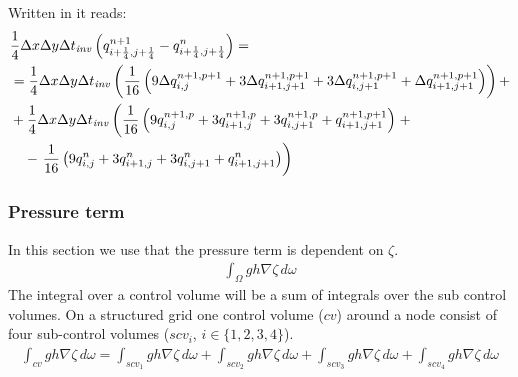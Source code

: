 Written in \deltaformulation  it reads:
\begin{align}
    &\frac{1}{4}\Delta x\Delta y\Delta t_{\it{inv}} \left( q^{n+1}_{i+\frac{1}{4}, j+\frac{1}{4}} -  q^{n}_{i+\frac{1}{4}, j+\frac{1}{4}} \right) =
    \\*
    &=\frac{1}{4}\Delta x\Delta y\Delta t_{\it{inv}} \left( \frac{1}{16}\left( 9 \Delta q^{n+1,p+1}_{i, j} + 3 \Delta q^{n+1,p+1}_{i+1,j+1}  + 3 \Delta q^{n+1,p+1}_{i, j+1} + \Delta q^{n+1,p+1}_{i+1, j+1}\right) \right) +
    \\*
    & + \frac{1}{4}\Delta x\Delta y\Delta t_{\it{inv}} \left( \frac{1}{16}\left( 9 q^{n+1,p}_{i, j} + 3 q^{n+1,p}_{i+1,j}  + 3 q^{n+1,p}_{i, j+1} + q^{n+1,p+1}_{i+1, j+1}\right) \right. +
    \\*
    &\quad - \left. \frac{1}{16}\left( 9 q^{n}_{i, j} +  3 q^{n}_{i+1,j}  + 3  q^{n}_{i, j+1} + q^{n}_{i+1, j+1}\right)\right)
\end{align}
\subsubsection{Pressure term} \label{sec:linearized_pressure_zeta}
In this section we use that the pressure term is dependent on $\zeta$.
\begin{align}
    \int_{\Omega} gh \nabla \zeta \, d\omega
\end{align}
The integral over a control volume will be a sum of integrals over the sub control volumes.
On a structured grid one control volume ($cv$) around a node consist of four sub-control volumes ($scv_i$, $i\in\{1,2,3,4\}$).
\begin{align}
    \int_{cv}    gh \nabla \zeta\, d\omega =
    \int_{scv_1} gh \nabla \zeta\, d\omega +
    \int_{scv_2} gh \nabla \zeta\, d\omega +
    \int_{scv_3} gh \nabla \zeta\, d\omega +
    \int_{scv_4} gh \nabla \zeta\, d\omega
\end{align}


